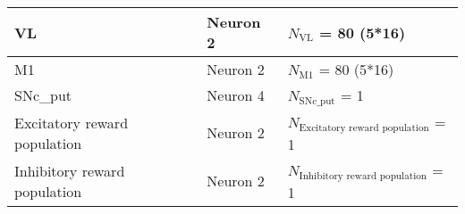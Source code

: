 \documentclass{article}
\begin{document}
\begin{tabularx}{\linewidth}{|l|l|X|}
    VL             & Neuron 2        & $N_{\text{VL}}$ = 80 (5*16)  \\ \hline

    M1             & Neuron 2        & $N_{\text{M1}}$ = 80 (5*16)  \\ \hline

    SNc\_put             & Neuron 4        & $N_{\text{SNc\_put}}$ = 1  \\ \hline

    Excitatory reward population             & Neuron 2        & $N_{\text{Excitatory reward population}}$ = 1  \\ \hline

    Inhibitory reward population             & Neuron 2        & $N_{\text{Inhibitory reward population}}$ = 1  \\ \hline

\end{tabularx}

\vspace{2ex}
\end{document}
